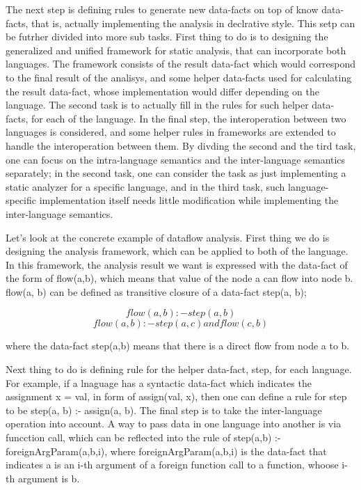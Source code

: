 The next step is defining rules to generate new data-facts on top of know
data-facts, that is, actually implementing the analysis in declrative style.
This setp can be futrher divided into more sub tasks. First thing to do is to
designing the generalized and unified framework for static analysis, that can
incorporate both languages. The framework consists of the result data-fact which
would correspond to the final result of the analisys, and some helper
data-facts used for calculating the result data-fact, whose implementation
would differ depending on the language. The second task is to actually fill in
the rules for such helper data-facts, for each of the language. In the final step,
the interoperation between two languages is considered, and some helper rules in frameworks are
extended to handle the interoperation between them. By divding the second and the tird task,
one can focus on the intra-language semantics and the inter-language semantics
separately; in the second task, one can consider the task as just implementing a
static analyzer for a specific language, and in the third task, such
language-specific implementation itself needs little modification while implementing
the inter-language semantics.

Let's look at the concrete example of dataflow analysis. First thing we do is
designing the analysis framework, which can be applied to both of the language.
In this framework, the analysis result we want is expressed with the data-fact
of the form of flow(a,b), which means that value of the node a can flow into
node b. flow(a, b) can be defined as transitive closure of a data-fact step(a,
b);

\[flow(a,b) :- step(a,b)\]
\[flow(a,b) :- step(a,c) and flow(c, b)\]

where the data-fact step(a,b) means that there is a direct flow from node a to b.


Next thing to do is defining rule for the helper data-fact, step, for each
language.  For example, if a lnaguage has a syntactic data-fact which indicates
the assignment x = val, in form of assign(val, x), then one can define a rule
for step to be step(a, b) :- assign(a, b). The final step is to take the
inter-language operation into account. A way to pass data in one language into
another is via funcction call, which can be reflected into the rule of
step(a,b) :- foreignArgParam(a,b,i), where foreignArgParam(a,b,i) is the
data-fact that indicates a is an i-th argument of a foreign function call to a
function, whoose i-th argument is b.

